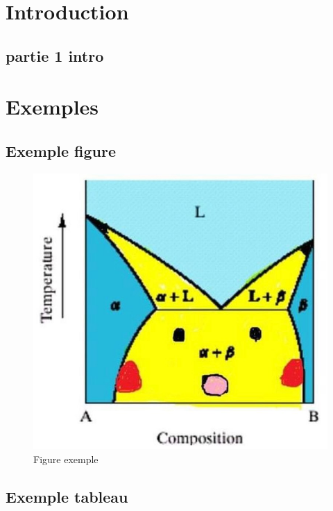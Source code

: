 \documentclass[a4paper,12pt,oneside]{report}	%
\begin{document}
\umonsCoverPage 
{}

\begin{abstract}    %
	...
\end{abstract}

\renewcommand{\abstractname}{Remerciements}     %
\begin{abstract}
     ...
\end{abstract}

\clearpage
\tableofcontents    %

\clearpage
{}

\chapter*{Introduction}
    \section*{partie 1 intro}


\chapter{Exemples}

\section{Exemple figure}

\begin{figure}[H]
    \centering
    \includegraphics[width=0.5\linewidth]{figures/pikachu.jpg}
    \caption{Figure exemple}
    \label{fig exemple}
\end{figure}


\section{Exemple tableau}
\end{document}
